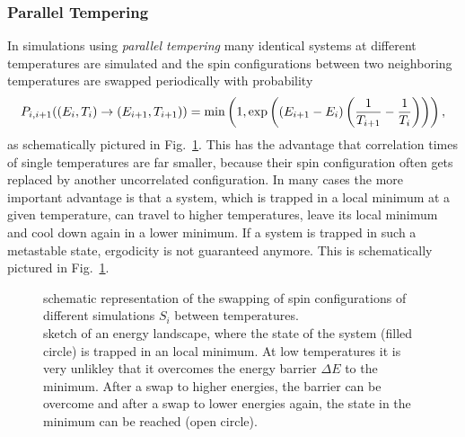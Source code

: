     \subsubsection{Parallel Tempering}
        In simulations using \emph{parallel tempering} \cite{ParallelTempering1986}
        many identical systems at different temperatures are simulated and
        the spin configurations between two neighboring temperatures are
        swapped periodically with probability \cite[p. 169ff]{NewmanBarkema1999} \cite[S. 155ff]{Katzgraber2011}
        \begin{equation}
            P_{i,i+1}((E_i,T_i) \to (E_{i+1},T_{i+1})) = \min\left(1,\exp\left(\left(E_{i+1}-E_i\right)\left(\frac{1}{T_{i+1}}-\frac{1}{T_i}\right)\right)\right),
            \label{eq:partemp}
        \end{equation}
        as schematically pictured in Fig.\ \ref{fig:parTemp}.
        This has the advantage that correlation times of single
        temperatures are far smaller, because their spin configuration
        often gets replaced by another uncorrelated configuration. In
        many cases the more important advantage is that a system, which
        is trapped in a local minimum at a given temperature, can travel
        to higher temperatures, leave its local minimum and cool down
        again in a lower minimum. If a system is trapped in such a
        metastable state, ergodicity is not guaranteed anymore.
        This is schematically pictured in Fig.\ \ref{fig:parTemp}.
        \begin{figure}[htbp]
            \centering
            \caption[Visualisation of the Parallel Tempering Algorithm]
            {
                 schematic representation of
                the swapping of spin configurations of different simulations \(S_i\)
                between temperatures.\\
                 sketch of an energy landscape, where
                the state of the system (filled circle) is trapped in an local
                minimum. At low temperatures it is very unlikley that it
                overcomes the energy barrier \(\Delta E\) to the minimum.
                After a swap to higher energies, the barrier can be overcome
                and after a swap to lower energies again, the state in
                the minimum can be reached (open circle).
            }
            \label{fig:parTemp}
        \end{figure}\\
